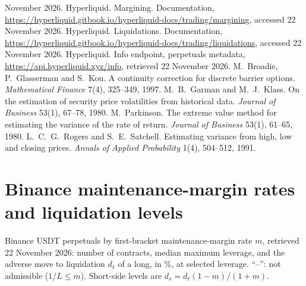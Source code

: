 \begin{thebibliography}{99}
November 2026.
 Hyperliquid. Margining. Documentation,
\url{https://hyperliquid.gitbook.io/hyperliquid-docs/trading/margining}, accessed 22 November 2026.
 Hyperliquid. Liquidations. Documentation,
\url{https://hyperliquid.gitbook.io/hyperliquid-docs/trading/liquidations}, accessed 22 November 2026.
 Hyperliquid. Info endpoint, perpetuals metadata, \url{https://api.hyperliquid.xyz/info},
retrieved 22 November 2026.
 M.~Broadie, P.~Glasserman and S.~Kou. A continuity correction for discrete barrier
options. \emph{Mathematical Finance} 7(4), 325--349, 1997.
 M.~B.~Garman and M.~J.~Klass. On the estimation of security price
volatilities from historical data. \emph{Journal of Business} 53(1), 67--78, 1980.
 M.~Parkinson. The extreme value method for estimating the variance of the rate of
return. \emph{Journal of Business} 53(1), 61--65, 1980.
 L.~C.~G.~Rogers and S.~E.~Satchell. Estimating variance from high, low and
closing prices. \emph{Annals of Applied Probability} 1(4), 504--512, 1991.
\end{thebibliography}

\appendix
\section{Binance maintenance-margin rates and liquidation levels}

\begin{table}[H]
\centering
\caption{Binance USDT perpetuals by first-bracket maintenance-margin rate $m$, retrieved 22 November
2026: number of contracts, median maximum leverage, and the adverse move to liquidation $d_\ell$ of a
long, in \%, at selected leverage. ``--'': not admissible ($1/L\le m$). Short-side levels are
$d_s=d_\ell(1-m)/(1+m)$.}
\label{tab:liq}
\footnotesize

\end{table}


